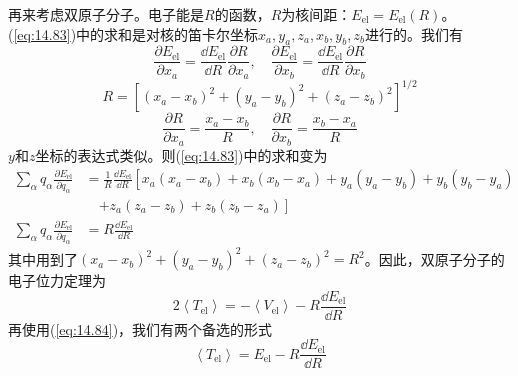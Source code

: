     再来考虑双原子分子。电子能是$R$的函数，$R$为核间距：$E_{\text{el}} = E_{\text{el}}\left(R\right)$。(\ref{eq:14.83})中的求和是对核的笛卡尔坐标$x_a, y_a, z_a, x_b, y_b, z_b$进行的。我们有
    \begin{equation*}
        \frac{\partial E_{\text{el}}}{\partial x_a} = \frac{\dd E_{\text{el}}}{\dd R} \frac{\partial R}{\partial x_a}, \quad \frac{\partial E_{\text{el}}}{\partial x_b} = \frac{\dd E_{\text{el}}}{\dd R} \frac{\partial R}{\partial x_b}
    \end{equation*}
    \begin{equation*}
        R = \left[\left(x_a - x_b\right)^2 + \left(y_a - y_b\right)^2 + \left(z_a - z_b\right)^2\right]^{1/2}
    \end{equation*}
    \begin{equation}
        \frac{\partial R}{\partial x_a} = \frac{x_a - x_b}{R}, \quad \frac{\partial R}{\partial x_b} = \frac{x_b - x_a}{R}
        \label{eq:14.85}
    \end{equation}
    $y$和$z$坐标的表达式类似。则(\ref{eq:14.83})中的求和变为
    \begin{equation*}
        \begin{aligned}
            \sum_{\alpha} q_{\alpha} \frac{\partial E_{\text{el}}}{\partial q_{\alpha}} &= \frac{1}{R} \frac{\dd E_{\text{el}}}{\dd R} \left[x_a \left(x_a - x_b\right) + x_b \left(x_b - x_a\right) + y_a \left(y_a - y_b\right) + y_b \left(y_b - y_a\right) \right. \\
            &\quad \left. + z_a \left(z_a - z_b\right) + z_b \left(z_b - z_a\right)\right] \\
            \sum_{\alpha} q_{\alpha} \frac{\partial E_{\text{el}}}{\partial q_{\alpha}} &= R \frac{\dd E_{\text{el}}}{\dd R}
        \end{aligned}
    \end{equation*}
    其中用到了$\left(x_a - x_b\right)^2 + \left(y_a - y_b\right)^2 + \left(z_a - z_b\right)^2 = R^2$。因此，双原子分子的电子位力定理为
    \begin{equation}
        2 \left\langle T_{\text{el}} \right\rangle = - \left\langle V_{\text{el}} \right\rangle - R \frac{\dd E_{\text{el}}}{\dd R}
        \label{eq:14.86}
    \end{equation}
    再使用(\ref{eq:14.84})，我们有两个备选的形式
    \begin{equation}
        \left\langle T_{\text{el}} \right\rangle = E_{\text{el}} - R \frac{\dd E_{\text{el}}}{\dd R}
        \label{eq:14.87}
    \end{equation}

